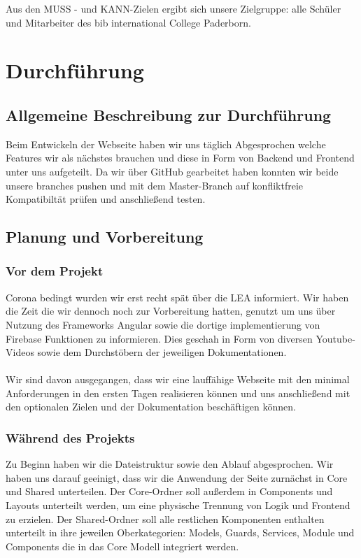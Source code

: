 \documentclass[12pt,titlepage]{article}
\begin{document}
Aus den MUSS - und KANN-Zielen ergibt sich unsere Zielgruppe: alle Schüler und Mitarbeiter des bib international College Paderborn. 


\section{Durchführung}

\subsection{Allgemeine Beschreibung zur Durchführung}

Beim Entwickeln der Webseite  haben wir uns täglich Abgesprochen welche Features wir als nächstes brauchen und diese in Form von  Backend und Frontend unter uns aufgeteilt. Da wir über GitHub gearbeitet haben konnten wir beide unsere branches pushen und mit dem Master-Branch auf konfliktfreie Kompatibiltät prüfen und anschließend testen.

\subsection{Planung und Vorbereitung}

\subsubsection{Vor dem Projekt}

Corona bedingt wurden wir erst recht spät über die LEA informiert. Wir haben die Zeit die wir dennoch noch zur Vorbereitung hatten, genutzt um uns über Nutzung des Frameworks Angular sowie die dortige implementierung von Firebase Funktionen zu informieren. Dies geschah in Form von diversen Youtube-Videos sowie dem Durchstöbern der jeweiligen Dokumentationen.\\ \\
Wir sind davon ausgegangen, dass wir eine lauffähige Webseite mit den minimal Anforderungen in den ersten Tagen realisieren können und uns anschließend mit den optionalen Zielen und der Dokumentation beschäftigen können.

\subsubsection{Während des Projekts}

Zu Beginn haben wir die Dateistruktur sowie den Ablauf abgesprochen. Wir haben uns darauf geeinigt, dass wir die Anwendung der Seite zurnächst in Core und Shared unterteilen. Der Core-Ordner soll außerdem in Components und Layouts unterteilt werden, um eine physische Trennung von Logik und Frontend zu erzielen. Der Shared-Ordner soll alle restlichen Komponenten enthalten unterteilt in ihre jeweilen Oberkategorien: Models, Guards, Services, Module und Components die in das Core Modell integriert werden. \\ \\
\end{document}
